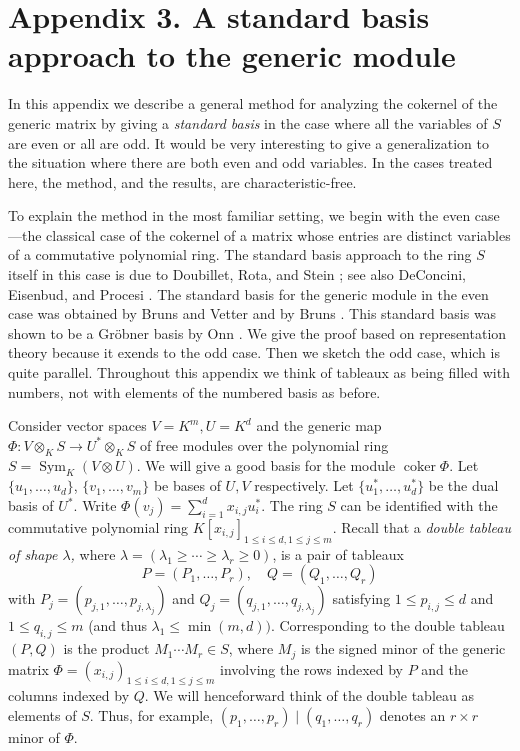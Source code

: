 \documentclass{tran-l}
\theoremstyle{plain}
\theoremstyle{remark}
\theoremstyle{definition}
\newcommand{\Sym}{\operatorname {Sym}}
\newcommand{\coker}{\operatorname{coker}}
\begin{document}
\section*{Appendix 3. A standard basis approach to the generic module}

In this appendix we describe a general method for analyzing the cokernel of the
generic matrix by giving a {\em standard basis\/} in the case where all the
variables of $S$ are even or all are odd. It would be very interesting to give
a generalization to the situation where there are both even and odd variables.
In the cases treated here, the method, and the results, are
characteristic-free.

To explain the method in the most familiar setting, we begin with the even
case---the classical case of the cokernel of a matrix whose entries are
distinct variables of a commutative polynomial ring. The standard basis
approach to the ring $S$ itself in this case is due to Doubillet, Rota, and
Stein \cite{DRS}; see also DeConcini, Eisenbud, and Procesi \cite{DEP}. The
standard basis for the generic module in the even case was obtained by Bruns
and Vetter \cite{BV} and by Bruns \cite{Bru}. This standard basis was shown to
be a Gr\"{o}bner basis by Onn \cite{Onn}. We give the proof based on
representation theory because it exends to the odd case. Then we  sketch the
odd case, which is quite parallel. Throughout this appendix we think of
tableaux as being filled with numbers, not with elements of the numbered basis
as before.

\medskip {} Consider vector spaces $V=K^{m},
U=K^{d}$ and the generic map $\Phi :V\otimes _{K} S\rightarrow U^{*}\otimes
_{K} S$  of free modules over the polynomial ring $S = \Sym_{K} (V\otimes U)$.
We will give a good basis for the module $\coker \Phi $. Let $\lbrace u_{1}
,\ldots ,u_{d}\rbrace $, $\lbrace v_{1} ,\ldots ,v_{m}\rbrace $ be bases of $U,
V$ respectively. Let $\lbrace u_{1}^{*} ,\ldots ,u_{d}^{*} \rbrace $ be the
dual basis of $U^{*}$. Write $\Phi (v_{j} )=\sum _{i=1}^{d} x_{i,j}u_{i}^{*}$.
The ring $S$ can be identified with the commutative  polynomial ring 
$K[x_{i,j}]_{1\le i\le d,1\le j\le m}$. Recall that a {\em double  tableau of
shape $\lambda $,\/} where  $\lambda = (\lambda _{1} \geq \cdots \geq \lambda
_{r}\geq 0)$,  is a pair of tableaux
\begin{equation*}P=(P_{1} ,\ldots ,P_{r} ),\quad Q=(Q_{1} ,\ldots ,Q_{r} )
\end{equation*} 
with
$P_{j} = (p_{j,1},\ldots ,p_{j,\lambda _{j}} )$ and
$Q_{j} = (q_{j,1},\ldots ,q_{j,\lambda _{j}} )$ 
satisfying 
$1\le p_{i,j}\le d$ and
$1\le q_{i,j}\le m$
(and thus $\lambda _{1}\leq \min (m,d))$. 
Corresponding to the double tableau $(P,Q)$
is the
product $M_{1}\cdots M_{r}\in S$, 
where $M_{j}$ is the signed minor of the generic matrix
$\Phi = (x_{i,j})_{1\le i\le d, 1\le j\le m}$ 
involving the rows indexed by $P$
and the columns indexed by $Q$. We will henceforward think of 
the double tableau as elements of $S$. Thus, for example,
$(p_{1},\dots ,p_{r})\mid (q_{1},\dots ,q_{r})$ denotes an $r\times r$
minor of $\Phi $.
\end{document}

